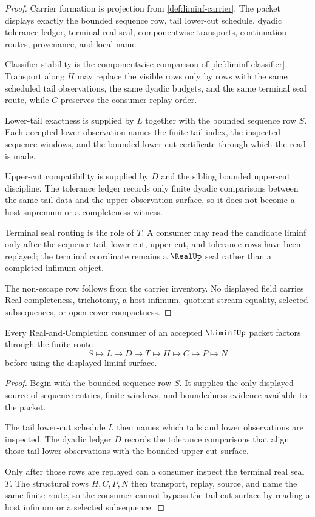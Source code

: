 \begin{proof}
Carrier formation is projection from \autoref{def:liminf-carrier}. The packet displays exactly the bounded sequence row, tail lower-cut schedule, dyadic tolerance ledger, terminal real seal, componentwise transports, continuation routes, provenance, and local name.

Classifier stability is the componentwise comparison of \autoref{def:liminf-classifier}. Transport along $H$ may replace the visible rows only by rows with the same scheduled tail observations, the same dyadic budgets, and the same terminal seal route, while $C$ preserves the consumer replay order.

Lower-tail exactness is supplied by $L$ together with the bounded sequence row $S$. Each accepted lower observation names the finite tail index, the inspected sequence windows, and the bounded lower-cut certificate through which the read is made.

Upper-cut compatibility is supplied by $D$ and the sibling bounded upper-cut discipline. The tolerance ledger records only finite dyadic comparisons between the same tail data and the upper observation surface, so it does not become a host supremum or a completeness witness.

Terminal seal routing is the role of $T$. A consumer may read the candidate liminf only after the sequence tail, lower-cut, upper-cut, and tolerance rows have been replayed; the terminal coordinate remains a $\RealUp$ seal rather than a completed infimum object.

The non-escape row follows from the carrier inventory. No displayed field carries Real completeness, trichotomy, a host infimum, quotient stream equality, selected subsequences, or open-cover compactness.
\end{proof}

\begin{theorem}
\label{thm:liminf-tail-cut-route}
Every Real-and-Completion consumer of an accepted $\LiminfUp$ packet factors through the finite route
$$
S\longmapsto L\longmapsto D\longmapsto T\longmapsto H\longmapsto C\longmapsto P\longmapsto N
$$
before using the displayed liminf surface.
\end{theorem}
\begin{proof}
Begin with the bounded sequence row $S$. It supplies the only displayed source of sequence entries, finite windows, and boundedness evidence available to the packet.

The tail lower-cut schedule $L$ then names which tails and lower observations are inspected. The dyadic ledger $D$ records the tolerance comparisons that align those tail-lower observations with the bounded upper-cut surface.

Only after those rows are replayed can a consumer inspect the terminal real seal $T$. The structural rows $H,C,P,N$ then transport, replay, source, and name the same finite route, so the consumer cannot bypass the tail-cut surface by reading a host infimum or a selected subsequence.
\end{proof}

